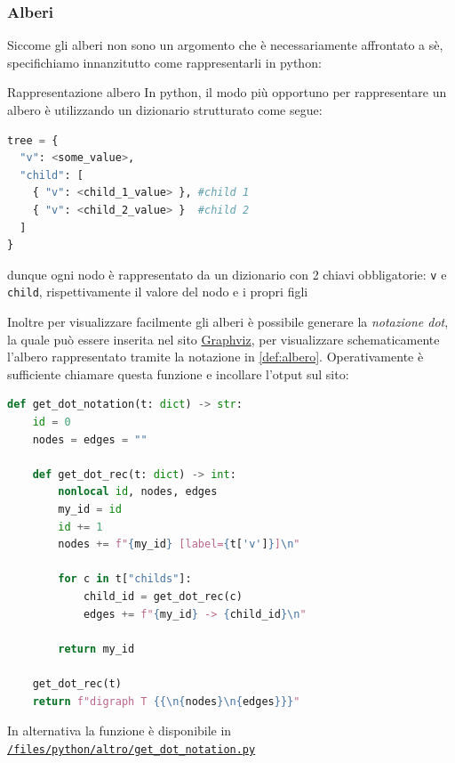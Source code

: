 \subsubsection{Alberi}
Siccome gli alberi non sono un argomento che è necessariamente affrontato a sè, specifichiamo innanzitutto come rappresentarli in python:
\begin{definizione}{Rappresentazione albero}\label{def:albero}
	In python, il modo più opportuno per rappresentare un albero è utilizzando un dizionario strutturato come segue:
	\begin{lstlisting}[language = python, frame = none]
tree = {
  "v": <some_value>,
  "child": [
    { "v": <child_1_value> }, #child 1
    { "v": <child_2_value> }  #child 2
  ]
}
  \end{lstlisting}
	dunque ogni nodo è rappresentato da un dizionario con 2 chiavi obbligatorie: \verb|v| e \verb|child|, rispettivamente il valore del nodo e i propri figli
\end{definizione}
Inoltre per visualizzare facilmente gli alberi è possibile generare la \textit{notazione dot}, la quale può essere inserita nel sito \href{https://dreampuf.github.io/GraphvizOnline/?engine=dot}{Graphviz}, per visualizzare schematicamente l'albero rappresentato tramite la notazione in \cref{def:albero}. Operativamente è sufficiente chiamare questa funzione e incollare l'otput sul sito:
\begin{lstlisting}[language = python, frame = none]
def get_dot_notation(t: dict) -> str:
    id = 0
    nodes = edges = ""

    def get_dot_rec(t: dict) -> int:
        nonlocal id, nodes, edges
        my_id = id
        id += 1
        nodes += f"{my_id} [label={t['v']}]\n"

        for c in t["childs"]:
            child_id = get_dot_rec(c)
            edges += f"{my_id} -> {child_id}\n"

        return my_id

    get_dot_rec(t)
    return f"digraph T {{\n{nodes}\n{edges}}}"
  \end{lstlisting}


In alternativa la funzione è disponibile in \texttt{\href{run:./files/python/altro/}{/files/python/altro/get\_dot\_notation.py}}


